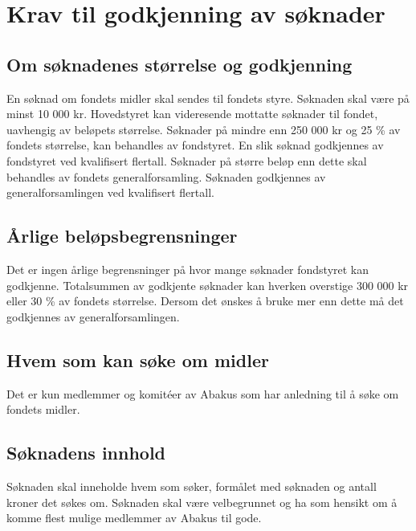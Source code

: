 \section{Krav til godkjenning av søknader}
\subsection{Om søknadenes størrelse og godkjenning}
En søknad om fondets midler skal sendes til fondets styre. Søknaden skal være
på minst 10 000 kr. Hovedstyret kan videresende mottatte søknader til fondet,
uavhengig av beløpets størrelse. Søknader på mindre enn 250 000 kr og 25 \% av
fondets størrelse, kan behandles av fondstyret. En slik søknad godkjennes av
fondstyret ved kvalifisert flertall. Søknader på
større beløp enn dette skal behandles av fondets generalforsamling. Søknaden
godkjennes av generalforsamlingen ved kvalifisert flertall.

\subsection{Årlige beløpsbegrensninger}
Det er ingen årlige begrensninger på hvor mange søknader fondstyret kan
godkjenne. Totalsummen av godkjente søknader kan hverken overstige 300 000 kr
eller 30 \% av fondets størrelse. Dersom det ønskes å bruke mer enn dette må
det godkjennes av generalforsamlingen.

\subsection{Hvem som kan søke om midler}
Det er kun medlemmer og komitéer av Abakus som har anledning til å søke om
fondets midler. 

\subsection{Søknadens innhold}
Søknaden skal inneholde hvem som søker, formålet med søknaden og antall kroner
det søkes om. Søknaden skal være velbegrunnet og ha som hensikt om å komme
flest mulige medlemmer av Abakus til gode. 
